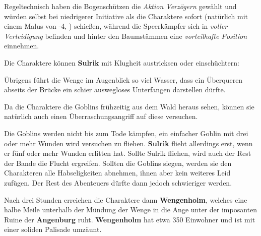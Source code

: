 Regeltechnisch haben die Bogenschützen die \emph{Aktion Verzögern} gewählt und würden selbst bei niedrigerer Initiative als die Charaktere sofort (natürlich mit einem Malus von -4, ) schießen, während die Speerkämpfer sich in \textit{voller Verteidigung} befinden und hinter den Baumstämmen eine \emph{vorteilhafte Position} einnehmen.

Die Charaktere können \textbf{Sulrik} mit Klugheit austricksen oder einschüchtern:



Übrigens führt die Wenge im Augenblick so viel Wasser, dass ein Überqueren abseits der Brücke ein schier auswegloses Unterfangen darstellen dürfte. 

Da die Charaktere die Goblins frühzeitig aus dem Wald heraus sehen, können sie natürlich auch einen Überraschungsangriff auf diese versuchen.



Die Goblins werden nicht bis zum Tode kämpfen, ein einfacher Goblin mit drei oder mehr Wunden wird versuchen zu fliehen.
\textbf{Sulrik} flieht  allerdings erst, wenn er fünf oder mehr Wunden erlitten hat.
Sollte Sulrik fliehen, wird auch der Rest der Bande die Flucht ergreifen.
Sollten die Goblins siegen, werden sie den Charakteren alle Habseligkeiten abnehmen, ihnen aber kein weiteres Leid zufügen.
Der Rest des Abenteuers dürfte dann jedoch schwieriger werden. 
%
%
%



Nach drei Stunden erreichen die Charaktere dann \textbf{Wengenholm}, welches eine halbe Meile unterhalb der Mündung der Wenge in die Ange unter der imposanten Ruine der \textbf{Angenburg} ruht.
\textbf{Wengenholm} hat etwa 350 Einwohner und ist mit einer soliden Palisade umzäunt.
	
